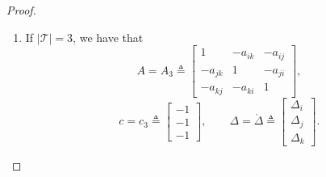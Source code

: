 \begin{proof}
\begin{enumerate}
	
	\item If $|\mathcal{T}| = 3$, we have that
	\begin{equation}
	\label{eq:A3}
		A = A_3 \triangleq \begin{bmatrix}
			       	1 & -a_{ik} & -a_{ij}  \\
				-a_{jk} & 1 & -a_{ji}  \\
				-a_{kj} & -a_{ki} & 1 
			\end{bmatrix},
	\end{equation}
	\begin{equation}
	\label{eq:c3}
		c = c_3 \triangleq \begin{bmatrix}
				-1 \\
				-1 \\
				-1
			\end{bmatrix}, \qquad
		\Delta = \mathring{\Delta} \triangleq \begin{bmatrix}
				\Delta_i \\
				\Delta_j \\
				\Delta_k
			\end{bmatrix}.
	\end{equation}
	

\end{enumerate}
\end{proof}
